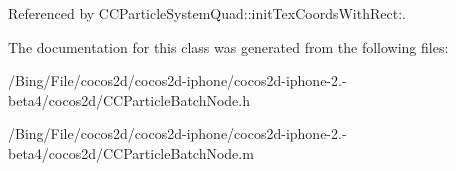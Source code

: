 Referenced by C\-C\-Particle\-System\-Quad\-::init\-Tex\-Coords\-With\-Rect\-:.



The documentation for this class was generated from the following files\-:\begin{DoxyCompactItemize}
\item 
/\-Bing/\-File/cocos2d/cocos2d-\/iphone/cocos2d-\/iphone-\/2.-\/beta4/cocos2d/C\-C\-Particle\-Batch\-Node.\-h\item 
/\-Bing/\-File/cocos2d/cocos2d-\/iphone/cocos2d-\/iphone-\/2.-\/beta4/cocos2d/C\-C\-Particle\-Batch\-Node.\-m\end{DoxyCompactItemize}
